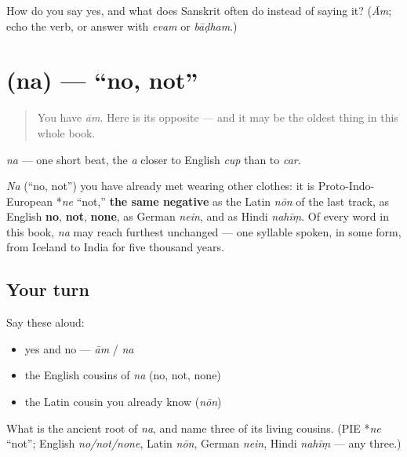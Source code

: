 \begin{tcolorbox}[breakable,colback=teal!4,colframe=teal!35!black,title={Before you move on}]
How do you say yes, and what does Sanskrit often do instead of saying it? (\emph{Ām}; echo the verb, or answer with \emph{evam} or \emph{bāḍham}.)
\end{tcolorbox}
\section[\texorpdfstring{\sk{न} (na)}{न (na)}]{ (na) — \textquotedblleft{}no, not\textquotedblright{}}

\label{lesson:SA-C01-na}



\begin{quote}
You have \emph{ām}. Here is its opposite — and it may be the oldest thing in this whole book.
\end{quote}

\begin{sounds}
\emph{na} — one short beat, the \emph{a} closer to English \emph{cup} than to \emph{car}.
\end{sounds}

\begin{cousinweb}
\emph{Na} (\textquotedblleft{}no, not\textquotedblright{}) you have already met wearing other clothes: it is Proto-Indo-European *\emph{ne} \textquotedblleft{}not,\textquotedblright{} \textbf{the same negative} as the Latin \emph{nōn} of the last track, as English \textbf{no}, \textbf{not}, \textbf{none}, as German \emph{nein}, and as Hindi \emph{nahīṃ}. Of every word in this book, \emph{na} may reach furthest unchanged — one syllable spoken, in some form, from Iceland to India for five thousand years.
\end{cousinweb}

\subsection*{Your turn}
Say these aloud:

\begin{itemize}
\raggedright
  \item yes and no — \emph{ām} / \emph{na}
  \item the English cousins of \emph{na} (no, not, none)
  \item the Latin cousin you already know (\emph{nōn})
\end{itemize}

\begin{tcolorbox}[breakable,colback=teal!4,colframe=teal!35!black,title={Before you move on}]
What is the ancient root of \emph{na}, and name three of its living cousins. (PIE *\emph{ne} \textquotedblleft{}not\textquotedblright{}; English \emph{no/not/none}, Latin \emph{nōn}, German \emph{nein}, Hindi \emph{nahīṃ} — any three.)
\end{tcolorbox}
